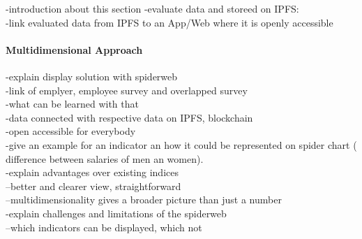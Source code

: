 -introduction about this section
-evaluate data and storeed on IPFS:\\
-link evaluated data from IPFS to an App/Web where it is openly accessible
\paragraph*{Multidimensional Approach}


-explain display solution with spiderweb\\
-link of emplyer, employee survey and overlapped survey\\
-what can be learned with that\\
-data connected with respective data on IPFS, blockchain\\
-open accessible for everybody\\
-give an example for an indicator an how it could be represented on spider chart ( difference between salaries of men an women).\\
-explain advantages over existing indices\\
--better and clearer view, straightforward\\
--multidimensionality gives a broader picture than just a number\\
-explain challenges and limitations of the spiderweb\\
--which indicators can be displayed, which not\\